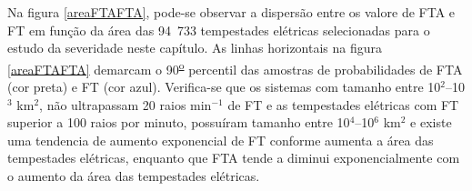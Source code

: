 

Na figura \ref{areaFTAFTA}, pode-se observar a dispersão entre os valore de FTA e FT em função da área das 94~733 tempestades elétricas selecionadas para o estudo da severidade neste capítulo. As linhas horizontais na figura \ref{areaFTAFTA} demarcam o 90\textsuperscript{\underline{o}} percentil das amostras de probabilidades de FTA (cor preta) e FT (cor azul). Verifica-se que os sistemas com tamanho entre 10$^2$--10$^3$ km$^2$, não ultrapassam 20 raios min$^{-1}$ de FT e as tempestades elétricas com FT superior a 100 raios por minuto, possuíram tamanho entre 10$^{4}$--10$^{6}$ km$^2$ e existe uma tendencia de aumento exponencial de FT conforme aumenta a área das tempestades elétricas, enquanto que FTA tende a diminui exponencialmente com o aumento da área das tempestades elétricas.




